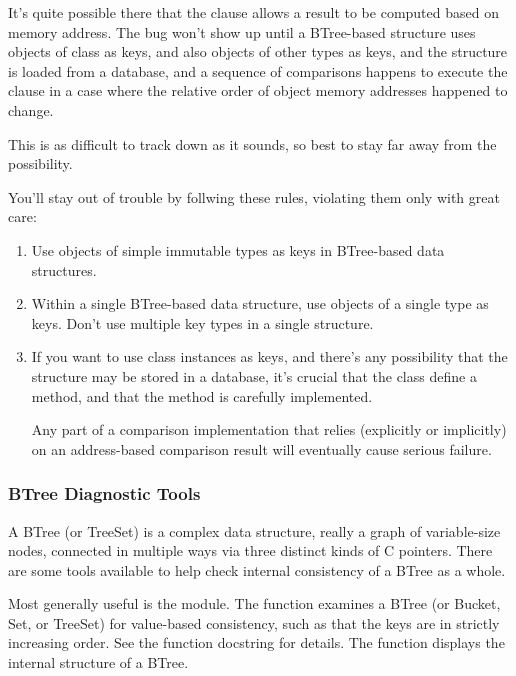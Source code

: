 It's quite possible there that the  clause allows
a result to be computed based on memory address.  The bug won't show
up until a BTree-based structure uses objects of class  as
keys, and also objects of other types as keys, and the structure is
loaded from a database, and a sequence of comparisons happens to execute
the  clause in a case where the relative order of object
memory addresses happened to change.

This is as difficult to track down as it sounds, so best to stay far
away from the possibility.

You'll stay out of trouble by follwing these rules, violating them
only with great care:

\begin{enumerate}
\item  Use objects of simple immutable types as keys in
       BTree-based data structures.

\item  Within a single BTree-based data structure, use objects of
       a single type as keys.  Don't use multiple key types in a
       single structure.

\item  If you want to use class instances as keys, and there's
       any possibility that the structure may be stored in a
       database, it's crucial that the class define a
        method, and that the method is
       carefully implemented.

       Any part of a comparison implementation that relies (explicitly
       or implicitly) on an address-based comparison result will
       eventually cause serious failure.
\end{enumerate}


\subsubsection{BTree Diagnostic Tools}

A BTree (or TreeSet) is a complex data structure, really a graph of
variable-size nodes, connected in multiple ways via three distinct kinds
of C pointers.  There are some tools available to help check internal
consistency of a BTree as a whole.

Most generally useful is the  module.  The
 function examines a BTree (or Bucket, Set, or
TreeSet) for value-based consistency, such as that the keys are in
strictly increasing order.  See the function docstring for details.
The  function displays the internal structure
of a BTree.

